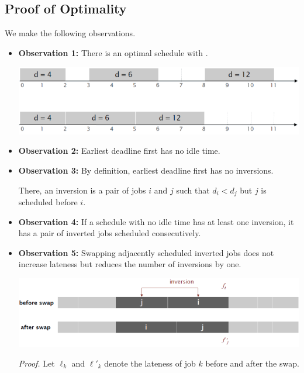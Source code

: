 \subsection{Proof of Optimality}

We make the following observations.

\begin{itemize}
    \item \textbf{Observation 1:} There is an optimal schedule with .

    \begin{center}
        \includegraphics[width=0.67\linewidth]{figures/minimizing-lateness-observation-1.png}
    \end{center}

    \item \textbf{Observation 2:} Earliest deadline first has no idle time.

    \item \textbf{Observation 3:} By definition, earliest deadline first has no inversions.

    There, an inversion is a pair of jobs $i$ and $j$ such that $d_i < d_j$ but $j$ is scheduled before $i$.

    \item \textbf{Observation 4:} If a schedule with no idle time has at least one inversion, it has a pair of inverted jobs scheduled consecutively.

    \item \textbf{Observation 5:} Swapping adjacently scheduled inverted jobs does not increase lateness but reduces the number of inversions by one.

    \begin{center}
        \includegraphics[width=0.67\linewidth]{figures/minimizing-lateness-observation-5.png}
    \end{center}

    \textit{Proof.}
        Let $\ell_k$ and $\ell'_k$ denote the lateness of job $k$ before and after the swap.


\end{itemize}
